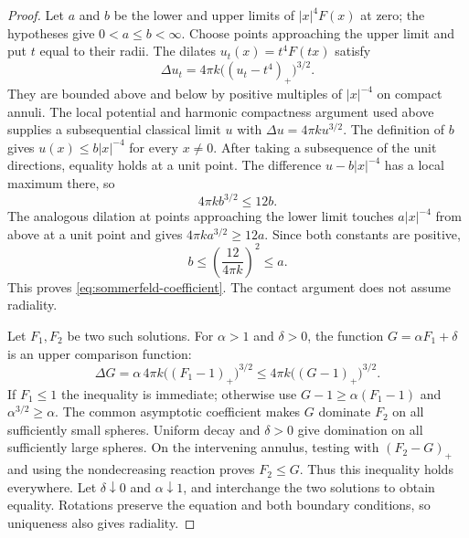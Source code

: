 \begin{proof}
Let $a$ and $b$ be the lower and upper limits of $|x|^4F(x)$ at zero;
the hypotheses give $0<a\le b<\infty$.  Choose points approaching
the upper limit and put $t$ equal to their radii.  The dilates
$u_t(x)=t^4F(tx)$ satisfy
\[
 \Delta u_t=4\pi k\bigl((u_t-t^4)_+\bigr)^{3/2}.
\]
They are bounded above and below by positive multiples of $|x|^{-4}$
on compact annuli.  The local potential and harmonic compactness
argument used above supplies a subsequential classical limit $u$
with $\Delta u=4\pi k u^{3/2}$.  The definition of $b$ gives
$u(x)\le b|x|^{-4}$ for every $x\ne0$.  After taking a subsequence
of the unit directions, equality holds at a unit point.  The
difference $u-b|x|^{-4}$ has a local maximum there, so
\[
 4\pi k b^{3/2}\le12b.
\]
The analogous dilation at points approaching the lower limit touches
$a|x|^{-4}$ from above at a unit point and gives
$4\pi k a^{3/2}\ge12a$.  Since both constants are positive,
\[
 b\le\left(\frac{12}{4\pi k}\right)^2\le a.
\]
This proves \cref{eq:sommerfeld-coefficient}.  The contact argument
does not assume radiality.

Let $F_1,F_2$ be two such solutions.  For $\alpha>1$ and $\delta>0$,
the function $G=\alpha F_1+\delta$ is an upper comparison function:
\[
 \Delta G=\alpha\,4\pi k\bigl((F_1-1)_+\bigr)^{3/2}
       \le4\pi k\bigl((G-1)_+\bigr)^{3/2}.
\]
If $F_1\le1$ the inequality is immediate; otherwise use
$G-1\ge\alpha(F_1-1)$ and $\alpha^{3/2}\ge\alpha$.
The common asymptotic coefficient makes $G$ dominate $F_2$ on all
sufficiently small spheres.  Uniform decay and $\delta>0$ give
domination on all sufficiently large spheres.  On the intervening
annulus, testing with $(F_2-G)_+$ and using the nondecreasing
reaction proves $F_2\le G$.  Thus this inequality holds everywhere.
Let $\delta\downarrow0$ and $\alpha\downarrow1$, and interchange
the two solutions to obtain equality.  Rotations preserve the
equation and both boundary conditions, so uniqueness also gives
radiality.
\end{proof}


